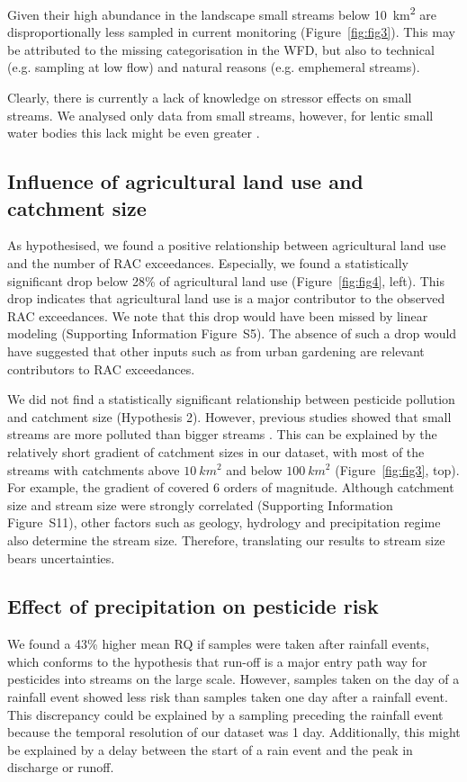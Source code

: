\documentclass[journal=esthag,manuscript=article]{achemso}
\begin{document}
Given their high abundance in the landscape \citep{nadeau_hydrological_2007} small streams below 10~km\textsuperscript{2} are disproportionally less sampled in current monitoring (Figure~\ref{fig:fig3}).
This may be attributed to the missing categorisation in the WFD, but also to technical (e.g. sampling at low flow) and natural reasons (e.g. emphemeral streams).

Clearly, there is currently a lack of knowledge on stressor effects on small streams.
We analysed only data from small streams, however, for lentic small water bodies this lack might be even greater \citep{lorenz_specifics_2016}. 


\subsection{Influence of agricultural land use and catchment size}
As hypothesised, we found a positive relationship between agricultural land use and the number of RAC exceedances.
Especially, we found a statistically significant drop below 28\% of agricultural land use (Figure~\ref{fig:fig4}, left).
This drop indicates that agricultural land use is a major contributor to the observed RAC exceedances. 
We note that this drop would have been missed by linear modeling (Supporting Information Figure~S5). 
The absence of such a drop would have suggested that other inputs such as from urban gardening are relevant contributors to RAC exceedances.  

We did not find a statistically significant relationship between pesticide pollution and catchment size (Hypothesis 2). 
However, previous studies showed that small streams are more polluted than bigger streams \citep{schulz_field_2004,stehle_pesticide_2015,knauer_pesticides_2016}.
This can be explained by the relatively short gradient of catchment sizes in our dataset, with most of the streams with catchments above $10~km^2$ and below $100~km^2$ (Figure~\ref{fig:fig3}, top).
For example, the gradient of \citet{schulz_field_2004} covered 6 orders of magnitude. 
Although catchment size and stream size were strongly correlated (Supporting Information Figure~S11), other factors such as geology, hydrology and precipitation regime also determine the stream size. 
Therefore, translating our results to stream size bears uncertainties.


\subsection{Effect of precipitation on pesticide risk}
We found a 43\% higher mean RQ if samples were taken after rainfall events, which conforms to the hypothesis that run-off is a major entry path way for pesticides into streams on the large scale.
However, samples taken on the day of a rainfall event showed less risk than samples taken one day after a rainfall event.
This discrepancy could be explained by a sampling preceding the rainfall event because the temporal resolution of our dataset was 1 day.
Additionally, this might be explained by a delay between the start of a rain event and the peak in discharge or runoff. 
\end{document}
